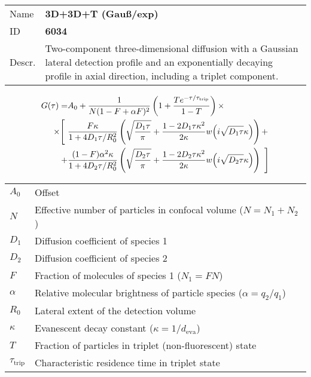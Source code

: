 \noindent \begin{tabular}{lp{}}
Name & \textbf{3D+3D+T (Gauß/exp)} \\ 
ID & \textbf{6034} \\ 
Descr. &  Two-component three-dimensional diffusion with a Gaussian lateral detection profile and an exponentially decaying profile in axial direction, including a triplet component. \\
\end{tabular}
\begin{align}
G(\tau) = &A_0 + \frac{1}{N (1-F + \alpha F)^2} \left(1 + \frac{T e^{-\tau/\tau_\mathrm{trip}}}{1-T}  \right)  \times \\
\notag \times  \Bigg[ \,\, & 
\frac{F \kappa}{1+ 4 D_1 \tau/R_0^2} 
\left( \sqrt{\frac{D_1 \tau}{\pi}} + \frac{1 - 2 D_1 \tau \kappa^2}{2 \kappa}  w\!\left(i \sqrt{D_1 \tau} \kappa\right) \right) + \\
 \notag + &
\frac{(1-F) \alpha^2 \kappa}{1+ 4 D_2 \tau/R_0^2} 
\left( \sqrt{\frac{D_2 \tau}{\pi}} + \frac{1 - 2 D_2 \tau \kappa^2}{2 \kappa}  w\!\left(i \sqrt{D_2 \tau} \kappa\right) \right) \,\, \Bigg]
\end{align} 
\begin{center}
\begin{tabular}{ll}
$A_0$ & Offset \\ 
$N$ & Effective number of particles in confocal volume ($N = N_1+N_2$) \\ 
$D_1$ &  Diffusion coefficient of species 1 \\ 
$D_2$ &  Diffusion coefficient of species 2 \\ 
$F$ & Fraction of molecules of species 1 ($N_1 = F N$) \\
$\alpha$ & Relative molecular brightness of particle species ($ \alpha = q_2/q_1$) \\
$R_0$ & Lateral extent of the detection volume \\
$\kappa$ &  Evanescent decay constant ($\kappa = 1/d_\mathrm{eva}$)\\ 
$T$ &  Fraction of particles in triplet (non-fluorescent) state\\ 
$\tau_\mathrm{trip}$ &  Characteristic residence time in triplet state \\ 
\end{tabular}
\end{center}
\vspace{2em}



